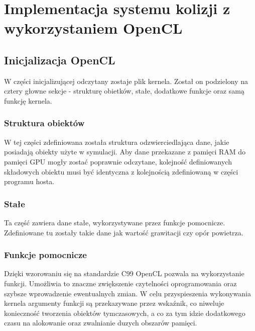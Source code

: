 \chapter{Implementacja systemu kolizji z wykorzystaniem OpenCL}

\section{Inicjalizacja OpenCL}
W części inicjalizującej odczytany zostaje plik kernela. Został on podzielony na cztery głowne sekcje - strukturę obietków, stałe, dodatkowe funkcje oraz samą funkcję kernela.

\subsection{Struktura obiektów}
W tej części zdefiniowana została struktura odzwierciedlająca dane, jakie posiadają obiekty użyte w symulacji. Aby dane przekazane z pamięci RAM do pamięci GPU mogły zostać poprawnie odczytane, kolejność definiowanych składowych obiektu musi być identyczna z kolejnością zdefiniowaną w części programu hosta.

\subsection{Stałe}
Ta część zawiera dane stałe, wykorzystywane przez funkcje pomocnicze. Zdefiniowane tu zostały takie dane jak wartość grawitacji czy opór powietrza.

\subsection{Funkcje pomocnicze}
Dzięki wzorowaniu się na standardzie C99 OpenCL pozwala na wykorzystanie funkcji. Umożliwia to znaczne zwiększenie czytelności oprogramowania oraz szybsze wprowadzenie ewentualnych zmian. W celu przyspieszenia wykonywania kernela argumenty funkcji są przekazywane przez wskaźnik, co niweluje konieczność tworzenia obiektów tymczasowych, a co za tym idzie dodatkowego czasu na alokowanie oraz zwalnianie duzych obszarów pamięci.

